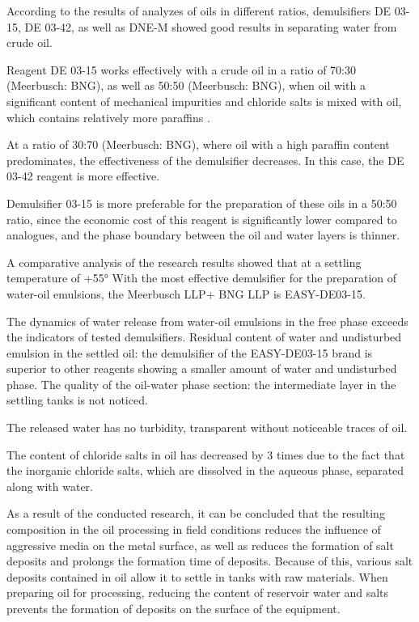 According to the results of analyzes of oils in different ratios,
demulsifiers DE 03-15, DE 03-42, as well as DNE-M showed good results in
separating water from crude oil.

Reagent DE 03-15 works effectively with a crude oil in a ratio of 70:30
(Meerbusch: BNG), as well as 50:50 (Meerbusch: BNG), when oil with a
significant content of mechanical impurities and chloride salts is mixed
with oil, which contains relatively more paraffins .

At a ratio of 30:70 (Meerbusch: BNG), where oil with a high paraffin
content predominates, the effectiveness of the demulsifier decreases. In
this case, the DE 03-42 reagent is more effective.

Demulsifier 03-15 is more preferable for the preparation of these oils
in a 50:50 ratio, since the economic cost of this reagent is
significantly lower compared to analogues, and the phase boundary
between the oil and water layers is thinner.

A comparative analysis of the research results showed that at a settling
temperature of +55° With the most effective demulsifier for the
preparation of water-oil emulsions, the Meerbusch LLP+ BNG LLP is
EASY-DE03-15.

The dynamics of water release from water-oil emulsions in the free phase
exceeds the indicators of tested demulsifiers. Residual content of water
and undisturbed emulsion in the settled oil: the demulsifier of the
EASY-DE03-15 brand is superior to other reagents showing a smaller
amount of water and undisturbed phase. The quality of the oil-water
phase section: the intermediate layer in the settling tanks is not
noticed.

The released water has no turbidity, transparent without noticeable
traces of oil.

The content of chloride salts in oil has decreased by 3 times due to the
fact that the inorganic chloride salts, which are dissolved in the
aqueous phase, separated along with water.

As a result of the conducted research, it can be concluded that the
resulting composition in the oil processing in field conditions reduces
the influence of aggressive media on the metal surface, as well as
reduces the formation of salt deposits and prolongs the formation time
of deposits. Because of this, various salt deposits contained in oil
allow it to settle in tanks with raw materials. When preparing oil for
processing, reducing the content of reservoir water and salts prevents
the formation of deposits on the surface of the equipment.

